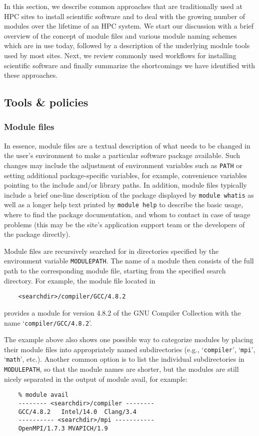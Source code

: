 In this section, we describe common approaches that are traditionally used at
HPC sites to install scientific software and to deal with the growing number
of modules over the lifetime of an HPC system. We start our discussion with a
brief overview of the concept of module files and various module naming
schemes which are in use today, followed by a description of the underlying
module tools used by most sites. Next, we review commonly used workflows for
installing scientific software and finally summarize the shortcomings we have
identified with these approaches.

\subsection{Tools \& policies}

\subsubsection{Module files}

In essence, module files are a textual description of what needs to be
changed in the user's environment to make a particular software package
available. Such changes may include the adjustment of environment variables
such as \texttt{PATH} or setting additional package-specific variables, for
example, convenience variables pointing to the include and/or library paths.
In addition, module files typically include a brief one-line description of
the package displayed by \texttt{module whatis} as well as a longer help text
printed by \texttt{module help} to describe the basic usage, where to find
the package documentation, and whom to contact in case of usage problems
(this may be the site's application support team or the developers of the
package directly).

Module files are recursively searched for in directories specified by the
environment variable \texttt{MODULEPATH}. The name of a module then consists
of the full path to the corresponding module file, starting from the
specified search directory. For example, the module file located in
\begin{verbatim}
    <searchdir>/compiler/GCC/4.8.2
\end{verbatim}
provides a module for version 4.8.2 of the GNU Compiler Collection with the
name `\texttt{compiler/GCC/4.8.2}'.

The example above also shows one possible way to categorize modules by
placing their module files into appropriately named subdirectories (e.g.,
`\texttt{compiler}', `\texttt{mpi}', `\texttt{math}', etc.). Another common
option is to list the individual subdirectories in \texttt{MODULEPATH}, so
that the module names are shorter, but the modules are still nicely separated
in the output of module avail, for example:
\begin{verbatim}
    % module avail
    -------- <searchdir>/compiler --------
    GCC/4.8.2   Intel/14.0  Clang/3.4
    ---------- <searchdir>/mpi -----------
    OpenMPI/1.7.3 MVAPICH/1.9
\end{verbatim}


